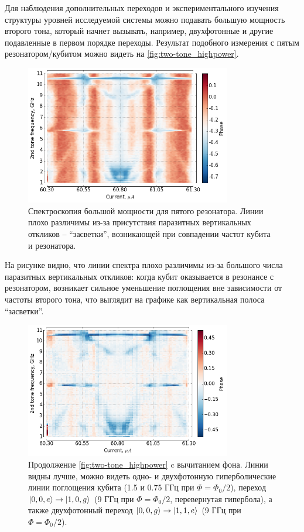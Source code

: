 \documentclass[12pt, twoside]{report}
\DeclarePairedDelimiter\ket{\lvert}{\rangle}
\numberwithin{equation}{section}
\numberwithin{figure}{section}
\begin{document}
Для наблюдения дополнительных переходов и экспериментального изучения структуры уровней исследуемой системы можно подавать большую мощность второго тона, который начнет вызывать, например, двухфотонные и другие подавленные в первом порядке переходы. Результат подобного измерения с пятым резонатором/кубитом можно видеть на \autoref{fig:two-tone_highpower}. 

\begin{figure}
\begingroup
\captionsetup{justification=normal}
\centering
\includegraphics[width=0.8\textwidth]{Pictures/two-tone_spectrum_highpower}
\caption{Спектроскопия большой мощности для пятого резонатора. Линии плохо различимы из-за присутствия паразитных вертикальных откликов -- ``засветки'', возникающей при совпадении частот кубита и резонатора.}
\label{fig:two-tone_highpower}
\endgroup
\end{figure}

На рисунке видно, что линии спектра плохо различимы из-за большого числа паразитных вертикальных откликов: когда кубит оказывается в резонансе с резонатором, возникает сильное уменьшение поглощения вне зависимости от частоты второго тона, что выглядит на графике как вертикальная полоса ``засветки''.

\begin{figure}
\begingroup
\captionsetup{justification=normal}
\centering
\includegraphics[width=0.8\textwidth]{Pictures/two-tone_spectrum_highpower_nb}
\caption{Продолжение \autoref{fig:two-tone_highpower} c вычитанием фона. Линии видны лучше, можно видеть одно- и двухфотонную гиперболические линии поглощения кубита (1.5 и 0.75 ГГц при $\Phi=\Phi_0/2$), переход $\ket{0, 0, e}\rightarrow\ket{1, 0, g}$ (9 ГГц при $\Phi=\Phi_0/2$, перевернутая гипербола), а также двухфотонный переход $\ket{0, 0, g}\rightarrow\ket{1,1,e}$ (9 ГГц при $\Phi=\Phi_0/2$).}
\label{fig:two-tone_highpower_nb}
\endgroup
\end{figure}
\end{document}
